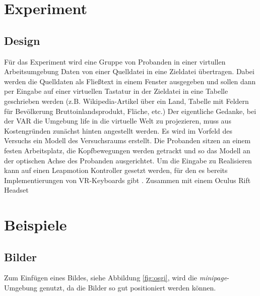 \documentclass[12pt,a4paper,bibliography=totocnumbered,listof=totocnumbered]{scrartcl}
\begin{document}
\section{Experiment}
\subsection{Design}
Für das Experiment wird eine Gruppe von Probanden in einer virtullen Arbeitsumgebung Daten von einer Quelldatei in eine Zieldatei übertragen. Dabei werden die Quelldaten als Fließtext in einem Fenster ausgegeben und sollen dann per Eingabe auf einer virtuellen Tastatur in der Zieldatei in eine Tabelle geschrieben werden (z.B. Wikipedia-Artikel über ein Land, Tabelle mit Feldern für Bevölkerung Bruttoinlandsprodukt, Fläche, etc.)
Der eigentliche Gedanke, bei der VAR die Umgebung life in die virtuelle Welt zu projezieren, muss aus Kostengründen zunächst hinten angestellt werden. Es wird im Vorfeld des Versuchs ein Modell des Versuchsraums erstellt. Die Probanden sitzen an einem festen Arbeitsplatz, die Kopfbewegungen werden getrackt und so das Modell an der optischen Achse des Probanden ausgerichtet.
Um die Eingabe zu Realisieren kann auf einen Leapmotion Kontroller gesetzt werden, für den es bereits Implementierungen von VR-Keyboards gibt \cite{leap-motion}. Zusammen mit einem Oculus Rift Headset
\renewcommand\refname{Quellenverzeichnis}


\pagebreak
\section{Beispiele}
\subsection{Bilder}
Zum Einfügen eines Bildes, siehe Abbildung \ref{fig:osgi}, wird die \textit{minipage}-Umgebung genutzt, da die Bilder so gut positioniert werden können.
\end{document}
